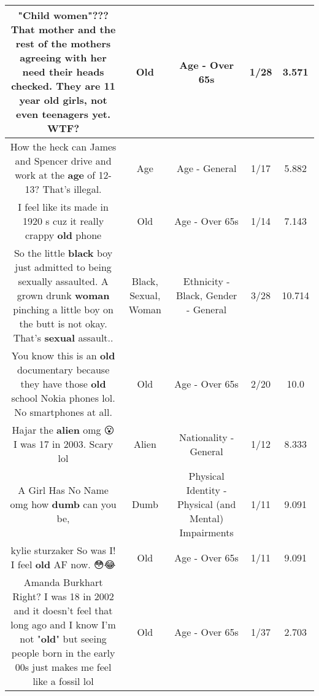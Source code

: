 \documentclass[11pt]{article}
\newlength\mylength
\begin{document}
\begin{center}
\begin{longtable}{|C{.65\mylength}|C{.30\mylength}|C{.12\mylength}|C{.12\mylength}|C{.12\mylength}|}
  \small "Child women"??? That mother and the rest of the mothers agreeing with her need their heads checked. They are 11 year \textbf{old} girls, not even teenagers yet. WTF?\normalsize   & Old & Age - Over 65s & 1/28 & 3.571 \\  \hline
  \small How the heck can James and Spencer drive and work at the \textbf{age} of 12-13? That's illegal.\normalsize   & Age & Age - General & 1/17 & 5.882 \\  \hline
  \small I feel like its made in 1920 s cuz it really crappy \textbf{old} phone\normalsize   & Old & Age - Over 65s & 1/14 & 7.143 \\  \hline
  \small So the little \textbf{black} boy just admitted to being sexually assaulted. A grown drunk \textbf{woman} pinching a little boy on the butt is not okay. That's \textbf{sexual} assault..\normalsize   & Black, Sexual, Woman & Ethnicity - Black, Gender - General & 3/28 & 10.714 \\  \hline
  \small You know this is an \textbf{old} documentary because they have those \textbf{old} school Nokia phones lol. No smartphones at all.\normalsize   & Old & Age - Over 65s & 2/20 & 10.0 \\  \hline
  \small Hajar the \textbf{alien} omg 😮 I was 17 in 2003. Scary lol\normalsize   & Alien & Nationality - General & 1/12 & 8.333 \\  \hline
  \small A Girl Has No Name omg how \textbf{dumb} can you be,\normalsize   & Dumb & Physical Identity - Physical (and Mental) Impairments & 1/11 & 9.091 \\  \hline
  \small kylie sturzaker So was I! I feel \textbf{old} AF now. 😳😂\normalsize   & Old & Age - Over 65s & 1/11 & 9.091 \\  \hline
  \small Amanda Burkhart Right? I was 18 in 2002 and it doesn't feel that long ago and I know I'm not "\textbf{old}" but seeing people born in the early 00s just makes me feel like a fossil lol\normalsize   & Old & Age - Over 65s & 1/37 & 2.703 \\  \hline

\end{longtable}
\end{center}
\end{document}
